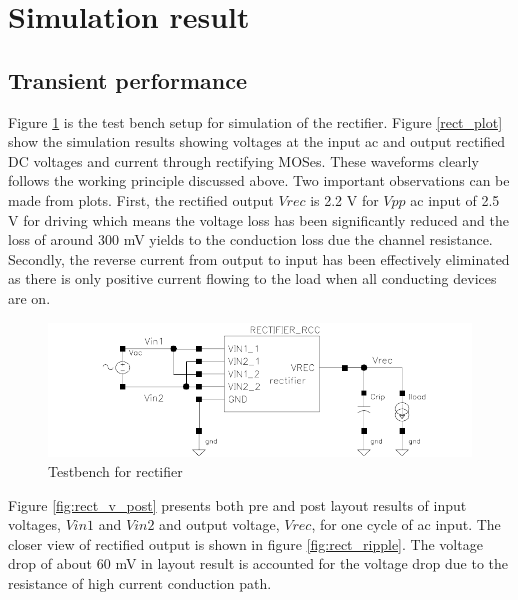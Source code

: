 \documentclass[12pt,a4paper,UKenglish]{report}
\begin{document}
\section{Simulation result}		%

\subsection{Transient performance}	%

Figure \ref{rect_tb} is the test bench setup for simulation of the rectifier. Figure \ref{rect_plot} show the simulation results showing voltages at the input ac and output rectified DC 
voltages and current through rectifying MOSes. These  
waveforms clearly follows the working principle discussed above. Two important observations can be made from 
plots. First, the rectified output $Vrec$ is 2.2 V for $Vpp$ ac input of 2.5 V for driving which means the 
voltage loss has been significantly reduced and the loss of around 300 mV yields to the conduction loss due 
the channel resistance. Secondly, the reverse current from output to input has been effectively eliminated as 
there is only positive current flowing to the load when all conducting devices 
are on.  \\

\begin{figure}[!htbp] %
   \centering
   \includegraphics[width=\textwidth]{img/rectifier_testbench.pdf} 
   \caption{Testbench for rectifier}
   \label{rect_tb}
\end{figure}

Figure  \ref{fig:rect_v_post}  presents both pre and post layout results of input voltages, $Vin1$ and $Vin2$  and output voltage, $Vrec$, for one cycle of ac input. The closer view of rectified output is shown in figure \ref{fig:rect_ripple}. The voltage drop of about 60 mV in layout result is accounted for the voltage drop due to 
the resistance of high current conduction path. \\
\end{document}
